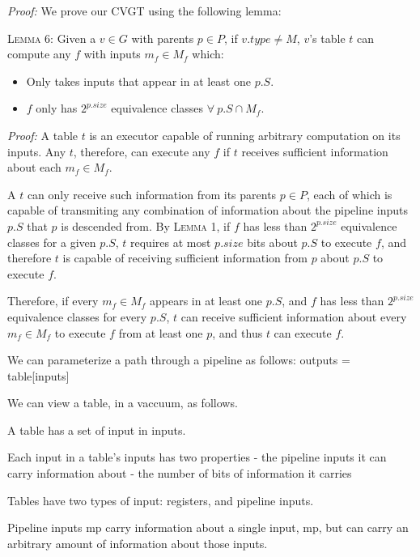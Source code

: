\noindent \textit{Proof:} We prove our CVGT using the following lemma:
\vspace{2mm}

\noindent \textsc{Lemma 6:} Given a $v \in G$ with parents $p \in P$, if $v.type \neq M$, $v$'s table $t$ can compute any $f$ with inputs $m_f \in M_f$ which:
\begin{itemize}
 \item Only takes inputs that appear in at least one $p.S$. 
 \item $f$ only has $2^{p.size}$ equivalence classes $\forall\ p.S \cap M_f$.
\end{itemize}
\vspace{2mm}

\noindent \textit{Proof:} A table $t$ is an executor capable of running arbitrary computation on its inputs. Any $t$, therefore, can execute any $f$ if $t$ receives sufficient information about each $m_f \in M_f$.

A $t$ can only receive such information from its parents $p \in P$, each of which is capable of transmiting any combination of information about the pipeline inputs $p.S$ that $p$ is descended from. By \textsc{Lemma 1}, if $f$ has less than $2^{p.size}$ equivalence classes for a given $p.S$, $t$ requires at most $p.size$ bits about $p.S$ to execute $f$, and therefore $t$ is capable of receiving sufficient information from $p$ about $p.S$ to execute $f$.

Therefore, if every $m_f \in M_f$ appears in at least one $p.S$, and $f$ has less than $2^{p.size}$ equivalence classes for every $p.S$, $t$ can receive sufficient information about every $m_f \in M_f$ to execute $f$ from at least one $p$, and thus $t$ can execute $f$.

\vspace{5mm}

We can parameterize a path through a pipeline as follows:
outputs = table[inputs]

We can view a table, in a vaccuum, as follows.

A table has a set of input in inputs.

Each input in a table's inputs has two properties
- the pipeline inputs it can carry information about
- the number of bits of information it carries

Tables have two types of input: registers, and pipeline inputs.

Pipeline inputs mp carry information about a single input, mp, but can carry an arbitrary amount of information about those inputs. 


